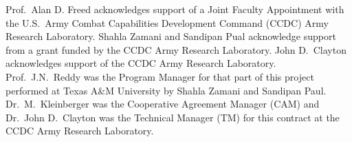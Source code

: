 \documentclass{arlticle}
\begin{document}

\arltitlepage%

\begin{createSFtwoNINEeight}
    \SFitemFIVEd{}
    \SFitemFIFTEEN{%
    }
    \SFitemEIGHTEEN{\ref{TotPages}}%
    \SFitemNINETEENa{%
    }
    \SFitemNINETEENb{%
    }
\end{createSFtwoNINEeight}
%

\tableofcontents%
\listoffigures%
\pagebreak
\listoftables*%
\acknowledgments
Prof.\ Alan D. Freed acknowledges support of a Joint Faculty Appointment with the U.S.\ Army Combat Capabilities Development Command (CCDC) Army Research Laboratory.  Shahla Zamani and Sandipan Pual acknowledge support from a grant funded by the CCDC Army Research Laboratory.  John D.\ Clayton acknowledges support of the CCDC Army Research Laboratory.  Prof.\ J.N.\ Reddy was the Program Manager for that part of this project performed at Texas A\&M University by Shahla Zamani and Sandipan Paul.  Dr.\ M.\ Kleinberger was the Cooperative Agreement Manager (CAM) and Dr.\ John D.\ Clayton was the Technical Manager (TM) for this contract at the CCDC Army Research Laboratory.
\end{document}
